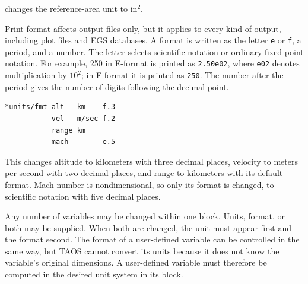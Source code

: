 changes the reference-area unit to in$^2$.


Print format affects output files only, but it applies to every kind of output,
including plot files and EGS databases. A format is written as the letter
\texttt{e} or \texttt{f}, a period, and a number. The letter selects scientific
notation or ordinary fixed-point notation. For example, 250 in E-format is printed as
\texttt{2.50e02}, where \texttt{e02} denotes multiplication by $10^2$; in
F-format it is printed as \texttt{250}. The number after the period gives the number
of digits following the decimal point.

\begin{lstlisting}[style=taosmanual]
*units/fmt alt   km    f.3
           vel   m/sec f.2
           range km
           mach        e.5
\end{lstlisting}

This changes altitude to kilometers with three decimal places, velocity to meters per
second with two decimal places, and range to kilometers with its default format.
Mach number is nondimensional, so only its format is changed, to scientific notation
with five decimal places.

Any number of variables may be changed within one block. Units, format, or both may
be supplied. When both are changed, the unit must appear first and the format second.
The format of a user-defined variable can be controlled in the same way, but TAOS
cannot convert its units because it does not know the variable's original dimensions.
A user-defined variable must therefore be computed in the desired unit system in its
 block.
